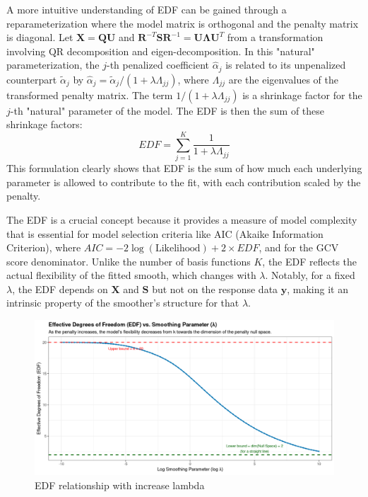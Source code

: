 \documentclass[11pt, a4paper]{article}
\begin{document}
A more intuitive understanding of EDF can be gained through a reparameterization where the model matrix is orthogonal and the penalty matrix is diagonal. Let $\mathbf{X} = \mathbf{Q}\mathbf{U}$ and $\mathbf{R}^{-T}\mathbf{S}\mathbf{R}^{-1} = \mathbf{U\Lambda U}^T$ from a transformation involving QR decomposition and eigen-decomposition. In this "natural" parameterization, the $j$-th penalized coefficient $\hat{\alpha}_j$ is related to its unpenalized counterpart $\tilde{\alpha}_j$ by $\hat{\alpha}_j = \tilde{\alpha}_j / (1 + \lambda \Lambda_{jj})$, where $\Lambda_{jj}$ are the eigenvalues of the transformed penalty matrix. The term $1 / (1 + \lambda \Lambda_{jj})$ is a shrinkage factor for the $j$-th "natural" parameter of the model. The EDF is then the sum of these shrinkage factors:
\[ EDF = \sum_{j=1}^K \frac{1}{1 + \lambda \Lambda_{jj}} \]
This formulation clearly shows that EDF is the sum of how much each underlying parameter is allowed to contribute to the fit, with each contribution scaled by the penalty.

The EDF is a crucial concept because it provides a measure of model complexity that is essential for model selection criteria like AIC (Akaike Information Criterion), where $AIC = -2 \log(\text{Likelihood}) + 2 \times EDF$, and for the GCV score denominator. Unlike the number of basis functions $K$, the EDF reflects the actual flexibility of the fitted smooth, which changes with $\lambda$. Notably, for a fixed $\lambda$, the EDF depends on $\mathbf{X}$ and $\mathbf{S}$ but not on the response data $\mathbf{y}$, making it an intrinsic property of the smoother's structure for that $\lambda$.

\begin{figure}[h!]
 \centering
 \includegraphics[width=1\linewidth]{edg_viz.png}
 \caption{EDF relationship with increase lambda}
 \label{fig:enter-label-5}
\end{figure}
\end{document}
